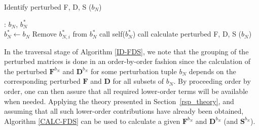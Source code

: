 \documentclass[%
 reprint,
 amsmath,amssymb,
 aps,
]{revtex4-1}
\begin{document}
\begin{algorithm}
\caption{Identify perturbed F, D, S ($b_{N}$)}
\label{ID-FDS}
\begin{algorithmic}
   : $b_{N}$, $b_{N}^{*}$\\

            \State $b_{N}^{*} \gets b_{N}$
            \State Remove $b_{N, i}^{*}$ from $b_{N}^{*}$
            \State call self($b_{N}^{*}$)
          \EndIf
      \EndFor
   \EndIf
        \State call calculate perturbed F, D, S ($b_{N}$)
      \EndIf
   \EndIf
\end{algorithmic}
\end{algorithm}

In the traversal stage of Algorithm \ref{ID-FDS}, we note that the grouping of
the perturbed matrices is done in an order-by-order fashion since the
calculation of the perturbed $\mathbf{F}^{b_{N}}$ and $\mathbf{D}^{b_{N}}$ for
some perturbation tuple $b_{N}$ depends on the corresponding perturbed
$\mathbf{F}$ and $\mathbf{D}$ for all subsets of $b_{N}$. By proceeding order
by order, one can then assure that all required lower-order terms will be
available when needed. Applying the theory presented in
Section~\ref{rsp_theory}, and assuming that all such lower-order contributions
have already been obtained, Algorithm \ref{CALC-FDS} can be used to calculate a
given $\mathbf{F}^{b_{N}}$ and $\mathbf{D}^{b_{N}}$ (and $\mathbf{S}^{b_{N}}$).

\end{document}
